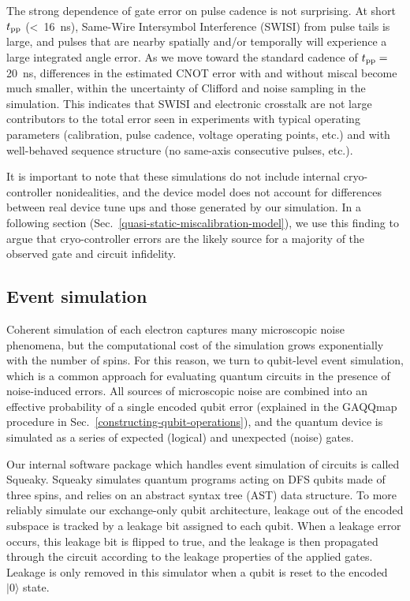 \documentclass[aps,prl,twocolumn,superscriptaddress,nobibnotes,10pt,floatfix]{revtex4-2}
\newcommand{\secref}[1]{Sec.~\ref{#1}}
\newcommand{\ts}[2]{{#1}_{\textnormal{#2}}}
\newcommand{\tpp}{\ts{t}{pp}}
\begin{document}
The strong dependence of gate error on pulse cadence is not surprising.
At short \(\tpp\) (\textless{}~16~ns), Same-Wire Intersymbol Interference (SWISI) from pulse tails is large, and pulses that are nearby spatially and/or temporally will experience a large integrated angle error.
As we move toward the standard cadence of \(\tpp = \ \)20~ns, differences in the estimated CNOT error with and without miscal become much smaller, within the uncertainty of Clifford and noise sampling in the simulation.
This indicates that SWISI and electronic crosstalk are not large contributors to the total error seen in experiments with typical operating parameters (calibration, pulse cadence, voltage operating points, etc.) and with well-behaved sequence structure (no same-axis consecutive pulses, etc.).

It is important to note that these simulations do not include internal cryo-controller nonidealities, and the device model does not account for differences between real device tune ups and those generated by our simulation.
In a following section (\secref{quasi-static-miscalibration-model}), we use this finding to argue that cryo-controller errors are the likely source for a majority of the observed gate and circuit infidelity.

\subsection{Event simulation}\label{event-simulation}

Coherent simulation of each electron captures many microscopic noise phenomena, but the computational cost of the simulation grows exponentially with the number of spins.
For this reason, we turn to qubit-level event simulation, which is a common approach for evaluating quantum circuits in the presence of noise-induced errors.
All sources of microscopic noise are combined into an effective probability of a single encoded qubit error (explained in the GAQQmap procedure in \secref{constructing-qubit-operations}), and the quantum device is simulated as a series of expected (logical) and unexpected (noise) gates.

Our internal software package which handles event simulation of circuits is called Squeaky.
Squeaky simulates quantum programs acting on DFS qubits made of three spins, and relies on an abstract syntax tree (AST) data structure.
To more reliably simulate our exchange-only qubit architecture, leakage out of the encoded subspace is tracked by a leakage bit assigned to each qubit.
When a leakage error occurs, this leakage bit is flipped to true, and the leakage is then propagated through the circuit according to the leakage properties of the applied gates.
Leakage is only removed in this simulator when a qubit is reset to the encoded \(|0\rangle\) state.
\end{document}
